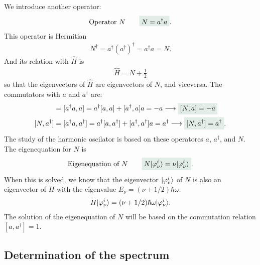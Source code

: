 We introduce another operator:
\begin{align}
    \text{Operator $N$}\qquad\highlight{N=a^\dagger a}.
\end{align}
This operator is Hermitian 
\begin{align}
    N^\dagger=a^\dagger(a^\dagger)^\dagger=a^\dagger a=N.
\end{align}
And its relation with $\hat{H}$ is 
\begin{align}
    \hat{H}=N+\frac{1}{2}
\end{align}
so that the eigenvectors of $\hat{H}$ are eigenvectors of $N$, and viceversa. The commutators with $a$ and $a^\dagger$ are:
\begin{align}
    [N,a]&=[a^\dagger a,a]=a^\dagger[a,a]+[a^\dagger,a]a=-a\longrightarrow\highlight{[N,a]=-a}\\
    [N,a^\dagger]&=[a^\dagger a,a^\dagger]=a^\dagger[a,a^\dagger]+[a^\dagger,a^\dagger]a=a^\dagger\longrightarrow\highlight{[N,a^\dagger]=a^\dagger}.
\end{align}
The study of the harmonic oscilator is based on these operatores $a$, $a^\dagger$, and $N$. The eigenequation for $N$ is 
\begin{align}
    \text{Eigenequation of $N$}\qquad\highlight{N\ket{\varphi_\nu^i}=\nu\ket{\varphi_\nu^i}}.
\end{align}
When this is solved, we know that the eigenvector $|\varphi_\nu^i\rangle$ of $N$ is also an eigenvector of $H$ with the eigenvalue $E_\nu=(\nu+1/2)\hbar\omega$:
\begin{align}
    H|\varphi_\nu^i\rangle=(\nu+1/2)\hbar\omega|\varphi_\nu^i\rangle.
\end{align}
The solution of the eigenequation of $N$ will be based on the commutation relation $[a,a^\dagger]=1$.

%
\subsection{Determination of the spectrum}

